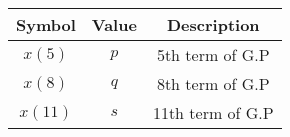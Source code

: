   \begin{tabular}{|c|c|c|}
    \hline
            \textbf{Symbol} & \textbf{Value} & \textbf{Description} \\
    \hline
          $x(5)$ & $p$ & 5th term of G.P \\
    \hline
          $x(8)$ & $q$ & 8th term of G.P\\
    \hline 
          $x({11})$ &$s$ &11th term of G.P \\
    \hline
  \end{tabular}

